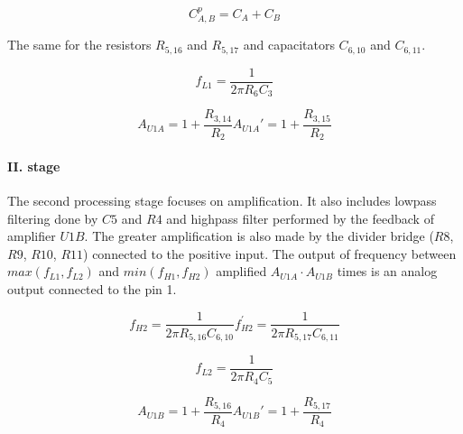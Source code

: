 \begin{equation}
C_{A,B}^{p} = C_A + C_B
\end{equation}

The same for the resistors $R_{5,16}$ and $R_{5,17}$ and capacitators $C_{6,10}$ and $C_{6,11}$.

\begin{equation}
f_{L1} = \frac{1}{2 \pi R_6 C_3}
\end{equation}

\begin{subequations}
\begin{equation}
A_{U1A} = 1 + \frac{R_{3,14}}{R_2}
\end{equation}
\begin{equation}
A_{U1A}' = 1 + \frac{R_{3,15}}{R_2}
\end{equation}
\end{subequations}

\paragraph{II. stage}
The second processing stage focuses on amplification. It also includes lowpass filtering done
by $C5$ and $R4$ and highpass filter performed by the feedback of amplifier $U1B$. The greater
amplification is also made by the divider bridge ($R8$, $R9$, $R10$, $R11$) connected to the
positive input. The output of frequency between $max(f_{L1}, f_{L2})$ and $min(f_{H1}, f_{H2})$
amplified $A_{U1A} \cdot A_{U1B}$ times is an analog output connected to the pin 1.

\begin{subequations}
\begin{equation}
f_{H2} = \frac{1}{2 \pi R_{5,16} C_{6,10}}
\end{equation}

\begin{equation}
f_{H2}^{'} = \frac{1}{2 \pi R_{5,17} C_{6,11}}
\end{equation}
\end{subequations}

\begin{equation}
f_{L2} = \frac{1}{2 \pi R_4 C_5}
\end{equation}

\begin{subequations}
\begin{equation}
A_{U1B} = 1 + \frac{R_{5,16}}{R_4}
\end{equation}
\begin{equation}
A_{U1B}' = 1 + \frac{R_{5,17}}{R_4}
\end{equation}
\end{subequations}

